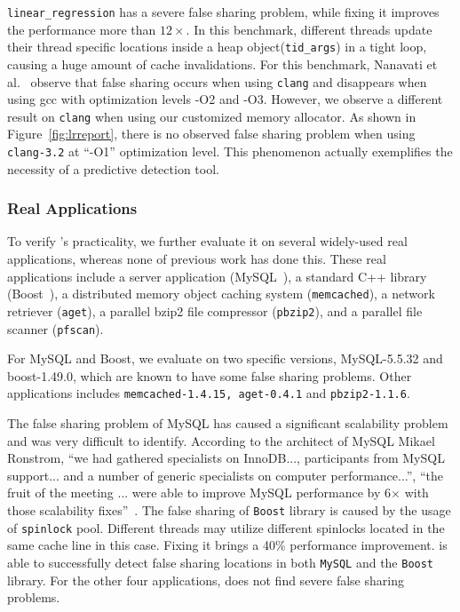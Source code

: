 \texttt{linear\_regression} has a severe false sharing problem, while fixing it improves the performance more than $12\times$. In this benchmark, different threads update their thread specific locations inside a heap object(\texttt{tid\_args}) in a tight loop,  causing a huge amount of cache invalidations. For this benchmark, Nanavati et al.~\cite{OSdetection} observe that false sharing occurs when using \texttt{clang} and disappears when using gcc with optimization levels -O2 and -O3. However, we observe a different result on \texttt{clang} when using our customized memory allocator. As shown in Figure~\ref{fig:lrreport}, there is no observed false sharing problem when using \texttt{clang-3.2} at ``-O1'' optimization level. This phenomenon actually exemplifies the necessity of a predictive detection tool. 

\subsubsection{Real Applications}
To verify \Predator{}'s practicality, we further evaluate it on several widely-used real applications, whereas none of previous work has done this. These real applications include a server application (MySQL~\cite{mysql}),
a standard C++ library (Boost~\cite{libfalsesharing}),
a distributed memory object caching system (\texttt{memcached}), a network retriever (\texttt{aget}),
a parallel bzip2 file compressor (\texttt{pbzip2}), and a parallel file scanner (\texttt{pfscan}).

For MySQL and Boost, we evaluate on two specific versions, MySQL-5.5.32 and boost-1.49.0, which are known to have some false sharing problems. Other applications includes \texttt{memcached-1.4.15, aget-0.4.1} and \texttt{pbzip2-1.1.6}.

The false sharing problem of MySQL has caused a significant scalability problem and was very difficult to identify.
According to the architect of MySQL Mikael Ronstrom, ``we had gathered specialists on InnoDB..., participants from MySQL support... and a number of generic specialists on 
computer performance...'', ``the fruit of the meeting ... were able to improve MySQL performance by 6$\times$ with those scalability fixes''~\cite{mysql}. 
The false sharing of \texttt{Boost} library is caused by the usage of \texttt{spinlock} pool. Different threads may utilize different spinlocks located in the same cache line in this case. Fixing it brings a 40\% performance improvement.
\Predator{} is able to successfully detect false sharing locations in both \texttt{MySQL} and the \texttt{Boost} library. 
For the other four applications, \Predator{} does not find severe false sharing problems.

